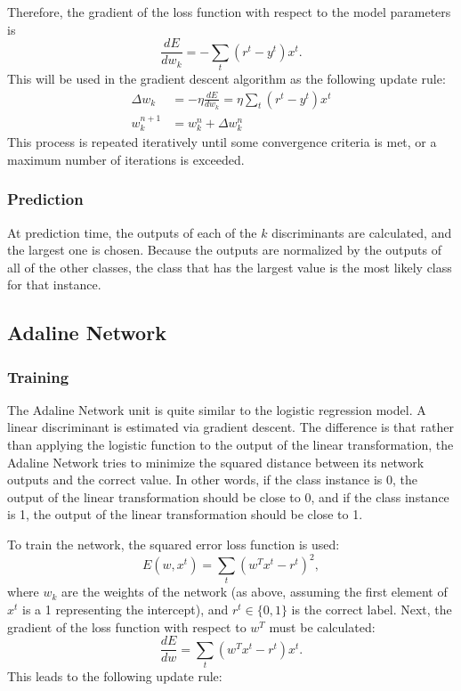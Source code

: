 \documentclass{amsart}
\begin{document}
    Therefore, the gradient of the loss function with respect to the model parameters is
    \[
        \frac{dE}{dw_k} = - \sum_t (r^t - y^t) x^t.
    \]
    This will be used in the gradient descent algorithm as the following update rule:
    \begin{align*}
        \Delta w_k &= -\eta \frac{dE}{dw_k} = \eta \sum_t (r^t - y^t) x^t \\
        w^{n+1}_k &= w^{n}_k + \Delta w^{n}_k
    \end{align*}
    This process is repeated iteratively until some convergence criteria is met, or a maximum number
    of iterations is exceeded.

    \subsubsection*{Prediction}
    At prediction time, the outputs of each of the $k$ discriminants are calculated, and the largest one is chosen.
    Because the outputs are normalized by the outputs of all of the other classes, the class that has the largest
    value is the most likely class for that instance.

    \subsection{Adaline Network}
    \subsubsection*{Training}
    The Adaline Network\cite{adaline} unit is quite similar to the logistic regression model. A linear
    discriminant is estimated via gradient descent. The difference is that rather than
    applying the logistic function to the output of the linear transformation, the Adaline Network
    tries to minimize the squared distance between its network outputs and the correct value. In other
    words, if the class instance is 0, the output of the linear transformation should be close to 0,
    and if the class instance is 1, the output of the linear transformation should be close to 1.

    To train the network, the squared error loss function is used:
    \[
        E(w, x^t) = \sum_{t}(w^T x^t - r^t)^2,
    \]
    where $w_k$ are the weights of the network (as above, assuming the first element of $x^t$ is a 1 representing the
    intercept), and $r^t \in \{0, 1\}$ is the correct label. Next, the gradient of the loss function  with respect to
    $w^T$ must be calculated:
    \[
        \frac{dE}{dw} = \sum_t (w^T x^t - r^t)x^t.
    \]
    This leads to the following update rule:
\end{document}
